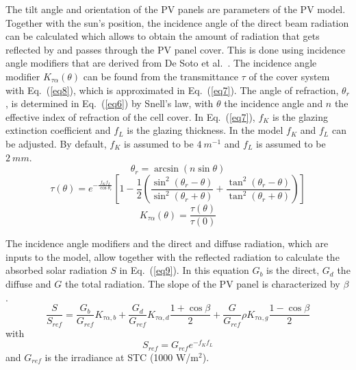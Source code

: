 The tilt angle and orientation of the PV panels are parameters of the PV model. Together with the sun's position, the incidence angle of the direct beam radiation can be calculated which allows to obtain the amount of radiation that gets reflected by and passes through the PV panel cover. This is done using incidence angle modifiers that are derived from De Soto et al.~\cite{desoto}. The incidence angle modifier $K_{\tau \alpha}(\theta)$ can be found from the transmittance $\tau$ of the cover system with Eq.~(\ref{eq8}), which is approximated in Eq.~(\ref{eq7}). The angle of refraction, $\theta _{r}$, is determined in Eq.~(\ref{eq6}) by Snell's law, with $\theta$ the incidence angle and $n$ the effective index of refraction of the cell cover. In Eq.~(\ref{eq7}), $f_K$ is the glazing extinction coefficient and $f_L$ is the glazing thickness. In the model $f_K$ and $f_L$ can be adjusted. By default, $f_K$ is assumed to be $4~m^{-1}$ and $f_L$ is assumed to be $2~mm$.
\begin{equation}
\theta _{r} = \arcsin(n \sin \theta)
\label{eq6}
\end{equation}
\begin{equation}
\tau (\theta) = e^{-\frac{f_K f_L}{\cos \theta _{r}}} \left[1 - \frac{1}{2} \left(\frac{\sin^{2}(\theta _{r} - \theta)}{\sin^{2}(\theta _{r} + \theta)} + \frac{\tan^{2}(\theta _{r} - \theta)}{\tan^{2}(\theta _{r} + \theta)} \right) \right]
\label{eq7}
\end{equation}
\begin{equation}
K_{\tau \alpha}(\theta) = \frac{\tau (\theta)}{\tau (0)}
\label{eq8}
\end{equation}

The incidence angle modifiers and the direct and diffuse radiation, which are inputs to the model, allow together with the reflected radiation to calculate the absorbed solar radiation $S$ in Eq.~(\ref{eq9}). In this equation $G_{b}$ is the direct, $G_{d}$ the diffuse and $G$ the total radiation. The slope of the PV panel is characterized by $\beta$.
\begin{equation}
\frac{S}{S_{ref}} = \frac{G_{b}}{G_{ref}} K_{\tau \alpha , b} + \frac{G_{d}}{G_{ref}} K_{\tau \alpha , d} \frac{1 + \cos \beta}{2} + \frac{G}{G_{ref}} \rho K_{\tau \alpha , g} \frac{1 - \cos \beta}{2}
\label{eq9}
\end{equation}
with
\begin{equation}
S_{ref} = G_{ref} e^{-f_K f_L}
\label{eqSref}
\end{equation}
and $G_{ref}$ is the irradiance at STC (1000 W/m$^2$).

